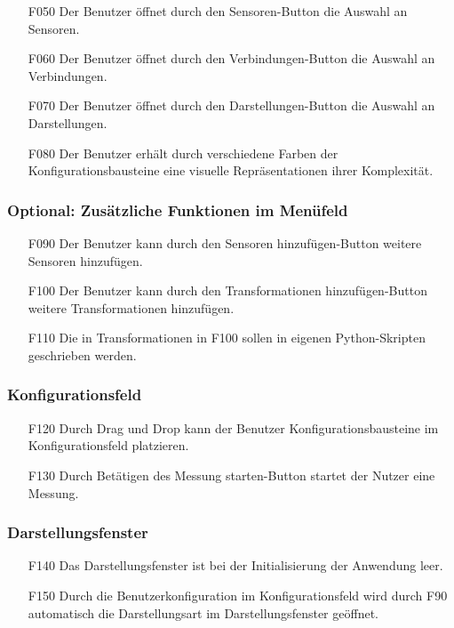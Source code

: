 \documentclass[parskip=full]{scrartcl}
\begin{document}
\begin{itemize}
\item[F050] Der Benutzer öffnet durch den Sensoren-Button die Auswahl an Sensoren.
\item[F060] Der Benutzer öffnet durch den Verbindungen-Button die Auswahl an Verbindungen.
\item[F070] Der Benutzer öffnet durch den Darstellungen-Button die Auswahl an Darstellungen.
\item[F080] Der Benutzer erhält durch verschiedene Farben der Konfigurationsbausteine eine visuelle Repräsentationen ihrer Komplexität.
\end{itemize}

\subsubsection{Optional: Zusätzliche Funktionen im Menüfeld}

\begin{itemize}

\item[F090] Der Benutzer kann durch den Sensoren hinzufügen-Button weitere Sensoren hinzufügen.
\item[F100] Der Benutzer kann durch den Transformationen hinzufügen-Button weitere Transformationen hinzufügen.
\item[F110] Die in Transformationen in F100 sollen in eigenen Python-Skripten geschrieben werden.
\end{itemize}

\subsubsection{Konfigurationsfeld}

\begin{itemize}
\item[F120] Durch Drag und Drop kann der Benutzer Konfigurationsbausteine im Konfigurationsfeld platzieren.
\item[F130] Durch Betätigen des Messung starten-Button startet der Nutzer eine Messung.
\end{itemize}

\subsubsection{Darstellungsfenster}

\begin{itemize}
\item[F140] Das Darstellungsfenster ist bei der Initialisierung der Anwendung leer.
\item[F150] Durch die Benutzerkonfiguration im Konfigurationsfeld wird durch F90 automatisch die Darstellungsart im Darstellungsfenster geöffnet.
\end{itemize}
\end{document}
